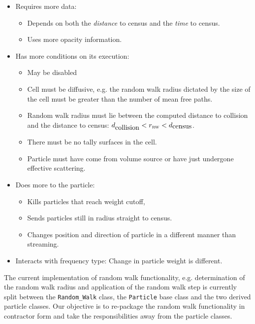 \documentclass[memo]{ResearchNote}
\begin{document}
\begin{itemize}
\item Requires more data: 
  \begin{itemize}
  \item Depends on both the {\em distance} to census and the {\em
      time} to census.
  \item Uses more opacity information.
  \end{itemize}
  
\item Has more conditions on its execution:
  \begin{itemize}
  \item May be disabled
  \item Cell must be diffusive, e.g. the random walk radius dictated
    by the size of the cell must be greater than the number of mean
    free paths. 
  \item Random walk radius must lie between the computed distance to
    collision and the distance to census: $d_{\mbox{collision}} <
    r_{\mbox{\tiny RW}} < d_{\mbox{census}}$. 
  \item There must be no tally surfaces in the cell.
  \item Particle must have come from volume source or have just
    undergone effective scattering.
  \end{itemize}

\item  Does more to the particle:
  \begin{itemize}
  \item Kills particles that reach weight cutoff, 
  \item Sends particles still in radius straight to census.
  \item Changes position and direction of particle in a different
    manner than streaming.
  \end{itemize}
  
\item Interacts with frequency type: Change in particle weight is
  different.
  
\end{itemize}

The current implementation of random walk functionality,
e.g. determination of the random walk radius and application of the
random walk step is currently split between the {\tt Random\_Walk}
class, the {\tt Particle} base class and the two derived particle
classes. Our objective is to re-package the random walk functionality
in contractor form and take the responsibilities away from the
particle classes.
\end{document}
